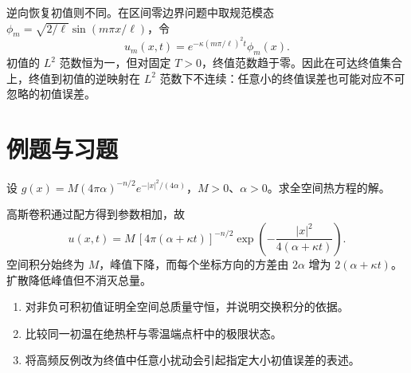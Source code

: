 逆向恢复初值则不同。在区间零边界问题中取规范模态 $\phi_m=\sqrt{2/\ell}\sin(m\pi x/\ell)$，令
\[
 u_m(x,t)=e^{-\kappa(m\pi/\ell)^2t}\phi_m(x).
\]
初值的 $L^2$ 范数恒为一，但对固定 $T>0$，终值范数趋于零。因此在可达终值集合上，终值到初值的逆映射在 $L^2$ 范数下不连续：任意小的终值误差也可能对应不可忽略的初值误差。

\section{例题与习题}
\begin{example}
设 $g(x)=M(4\pi\alpha)^{-n/2}e^{-|x|^2/(4\alpha)}$，$M>0$、$\alpha>0$。求全空间热方程的解。
\end{example}
\begin{solve}
高斯卷积通过配方得到参数相加，故
\[
 u(x,t)=M\,[4\pi(\alpha+\kappa t)]^{-n/2}
 \exp\left(-\frac{|x|^2}{4(\alpha+\kappa t)}\right).
\]
空间积分始终为 $M$，峰值下降，而每个坐标方向的方差由 $2\alpha$ 增为 $2(\alpha+\kappa t)$。扩散降低峰值但不消灭总量。
\end{solve}
\begin{enumerate}
 \item 对非负可积初值证明全空间总质量守恒，并说明交换积分的依据。
 \item 比较同一初温在绝热杆与零温端点杆中的极限状态。
 \item 将高频反例改为终值中任意小扰动会引起指定大小初值误差的表述。
\end{enumerate}


